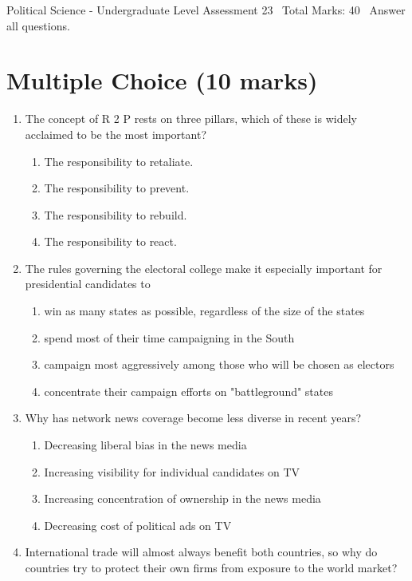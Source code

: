 \documentclass[12pt]{article}
\begin{document}
\begin{center}
Political Science - Undergraduate Level Assessment 23 \
Total Marks: 40 \
Answer all questions.
\end{center}

\section*{Multiple Choice (10 marks)}
\begin{enumerate}[label=\arabic*.]
\item The concept of R 2 P rests on three pillars, which of these is widely acclaimed to be the most important?
\begin{enumerate}[label=(\alph*)]
    \item The responsibility to retaliate.
    \item The responsibility to prevent.
    \item The responsibility to rebuild.
    \item The responsibility to react.
\end{enumerate}
\item The rules governing the electoral college make it especially important for presidential candidates to
\begin{enumerate}[label=(\alph*)]
    \item win as many states as possible, regardless of the size of the states
    \item spend most of their time campaigning in the South
    \item campaign most aggressively among those who will be chosen as electors
    \item concentrate their campaign efforts on "battleground" states
\end{enumerate}
\item Why has network news coverage become less diverse in recent years?
\begin{enumerate}[label=(\alph*)]
    \item Decreasing liberal bias in the news media
    \item Increasing visibility for individual candidates on TV
    \item Increasing concentration of ownership in the news media
    \item Decreasing cost of political ads on TV
\end{enumerate}
\item International trade will almost always benefit both countries, so why do countries try to protect their own firms from exposure to the world market?

\end{enumerate}
\end{document}
